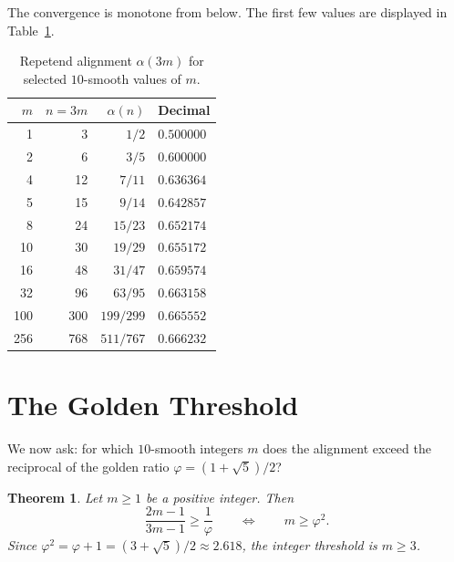 \documentclass[12pt]{amsart}
\newtheorem{theorem}{Theorem}
\theoremstyle{definition}
\theoremstyle{remark}
\begin{document}
The convergence is monotone from below. The first few values are
displayed in Table~\ref{tab:values}.

\begin{table}[h]
\centering
\begin{tabular}{rrrl}
\toprule
$m$ & $n = 3m$ & $\alpha(n)$ & Decimal \\
\midrule
1  &   3 & $1/2$    & $0.500000$ \\
2  &   6 & $3/5$    & $0.600000$ \\
4  &  12 & $7/11$   & $0.636364$ \\
5  &  15 & $9/14$   & $0.642857$ \\
8  &  24 & $15/23$  & $0.652174$ \\
10 &  30 & $19/29$  & $0.655172$ \\
16 &  48 & $31/47$  & $0.659574$ \\
32 &  96 & $63/95$  & $0.663158$ \\
100 & 300 & $199/299$ & $0.665552$ \\
256 & 768 & $511/767$ & $0.666232$ \\
\bottomrule
\end{tabular}
\caption{Repetend alignment $\alpha(3m)$ for selected $10$-smooth
values of $m$.}
\label{tab:values}
\end{table}

\section{The Golden Threshold}

We now ask: for which $10$-smooth integers $m$ does the alignment exceed
the reciprocal of the golden ratio $\varphi = (1+\sqrt{5})/2$?

\begin{theorem}\label{thm:golden}
Let $m \ge 1$ be a positive integer. Then
\[
\frac{2m-1}{3m-1} \ge \frac{1}{\varphi}
\qquad\Longleftrightarrow\qquad
m \ge \varphi^{2}.
\]
Since $\varphi^{2} = \varphi + 1 = (3+\sqrt{5})/2 \approx 2.618$,
the integer threshold is $m \ge 3$.
\end{theorem}
\end{document}
